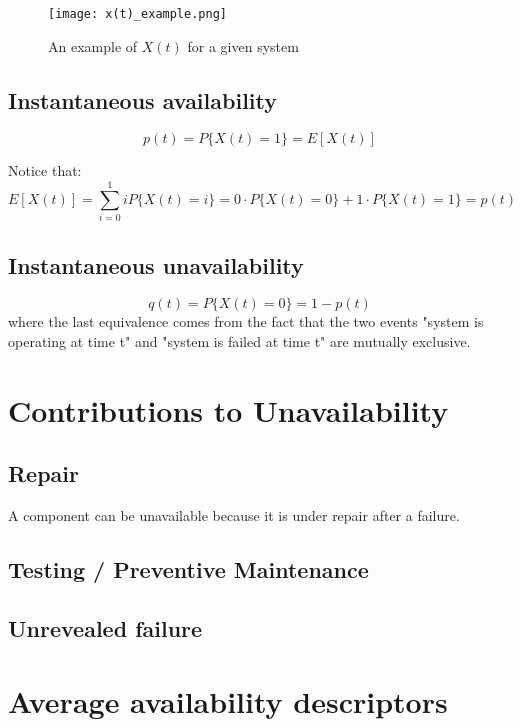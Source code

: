 \begin{figure}[!htp]
    \centering
    \texttt{[image: x(t)\_example.png]}
    \caption{An example of $X(t)$ for a given system}
\end{figure}

\subsection{Instantaneous availability}
\begin{equation*}
    p(t) = P\{X(t)=1\} = E[X(t)]
\end{equation*}

Notice that:
\begin{equation*}
    E[X(t)] = \sum_{i=0}^1 iP\{X(t)=i\} = 0\cdot P\{X(t)=0\} + 1\cdot P\{X(t)=1\} = p(t)
\end{equation*}

\subsection{Instantaneous unavailability}
\begin{equation*}
    q(t) = P\{X(t) = 0\} = 1 - p(t)
\end{equation*}
where the last equivalence comes from the fact that the two events "system is
operating at time t" and "system is failed at time t" are mutually exclusive.

\section{Contributions to Unavailability}
\subsection{Repair}
A component can be unavailable because it is under repair after a failure.

\subsection{Testing / Preventive Maintenance}

\subsection{Unrevealed failure}

\section{Average availability descriptors}